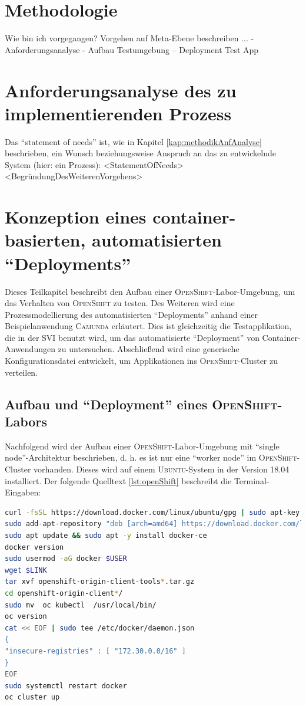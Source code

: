 \section{Methodologie}
Wie bin ich vorgegangen? Vorgehen auf Meta-Ebene beschreiben ...
- Anforderungsanalyse
- Aufbau Testumgebung 
-- Deployment Test App


\section{Anforderungsanalyse des zu implementierenden Prozess}
Das \enquote{statement of needs} ist, wie in Kapitel \vref{kap:methodikAnfAnalyse} beschrieben, ein Wunsch beziehungsweise Anspruch an das zu entwickelnde System (hier: ein Prozess): <StatementOfNeeds>
<BegründungDesWeiterenVorgehens> 

\section{Konzeption eines container-basierten, automatisierten \enquote{Deployments}}
Dieses Teilkapitel beschreibt den Aufbau einer \textsc{OpenShift}-Labor-Umgebung, um das Verhalten von \textsc{OpenShift} zu testen. Des Weiteren wird eine Prozessmodellierung des automatisierten \enquote{Deployments} anhand einer Beispielanwendung \textsc{Camunda} erläutert. Dies ist gleichzeitig die Testapplikation, die in der \ac{SVI} benutzt wird, um das automatisierte \enquote{Deployment} von Container-Anwendungen zu untersuchen. Abschließend wird eine generische Konfigurationsdatei entwickelt, um Applikationen ins \textsc{OpenShift}-Cluster zu verteilen.

\subsection{Aufbau und \enquote{Deployment} eines \textsc{OpenShift}-Labors}
Nachfolgend wird der Aufbau einer \textsc{OpenShift}-Labor-Umgebung mit \enquote{single node}-Architektur beschrieben, d. h. es ist nur eine \enquote{worker node} im \textsc{OpenShift}-Cluster vorhanden. Dieses wird auf einem \textsc{Ubuntu}-System in der Version 18.04 installiert. Der folgende Quelltext \vref{lst:openShift} beschreibt die Terminal-Eingaben:

\begin{lstlisting}[language=bash, caption={Installation des \textsc{OpenShift}-Clusters}, label=lst:openShift]
curl -fsSL https://download.docker.com/linux/ubuntu/gpg | sudo apt-key add -
sudo add-apt-repository "deb [arch=amd64] https://download.docker.com/linux/ubuntu $(lsb_release -cs) stable"
sudo apt update && sudo apt -y install docker-ce
docker version
sudo usermod -aG docker $USER
wget $LINK
tar xvf openshift-origin-client-tools*.tar.gz
cd openshift-origin-client*/
sudo mv  oc kubectl  /usr/local/bin/
oc version 
cat << EOF | sudo tee /etc/docker/daemon.json 
{
"insecure-registries" : [ "172.30.0.0/16" ]
}
EOF
sudo systemctl restart docker
oc cluster up
\end{lstlisting}

